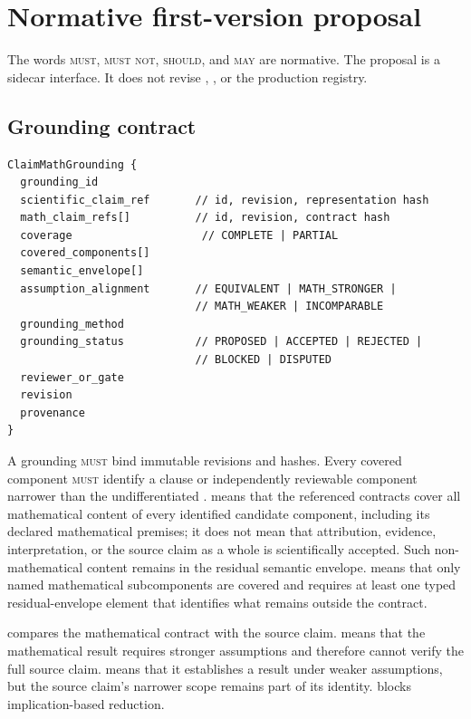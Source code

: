 \section{Normative first-version proposal}\label{sec:normative}

The words \textsc{must}, \textsc{must not}, \textsc{should}, and \textsc{may} are normative. The proposal is a sidecar interface. It does not revise \ScientificClaim{}, \MathClaim{}, or the production registry.

\subsection{Grounding contract}

\begin{lstlisting}[style=interface]
ClaimMathGrounding {
  grounding_id
  scientific_claim_ref       // id, revision, representation hash
  math_claim_refs[]          // id, revision, contract hash
  coverage                    // COMPLETE | PARTIAL
  covered_components[]
  semantic_envelope[]
  assumption_alignment       // EQUIVALENT | MATH_STRONGER |
                             // MATH_WEAKER | INCOMPARABLE
  grounding_method
  grounding_status           // PROPOSED | ACCEPTED | REJECTED |
                             // BLOCKED | DISPUTED
  reviewer_or_gate
  revision
  provenance
}
\end{lstlisting}

A grounding \textsc{must} bind immutable revisions and hashes. Every covered component \textsc{must} identify a clause or independently reviewable component narrower than the undifferentiated .  means that the referenced contracts cover all mathematical content of every identified candidate component, including its declared mathematical premises; it does not mean that attribution, evidence, interpretation, or the source claim as a whole is scientifically accepted. Such non-mathematical content remains in the residual semantic envelope.  means that only named mathematical subcomponents are covered and requires at least one typed residual-envelope element that identifies what remains outside the contract.

 compares the mathematical contract with the source claim.  means that the mathematical result requires stronger assumptions and therefore cannot verify the full source claim.  means that it establishes a result under weaker assumptions, but the source claim's narrower scope remains part of its identity.  blocks implication-based reduction.

